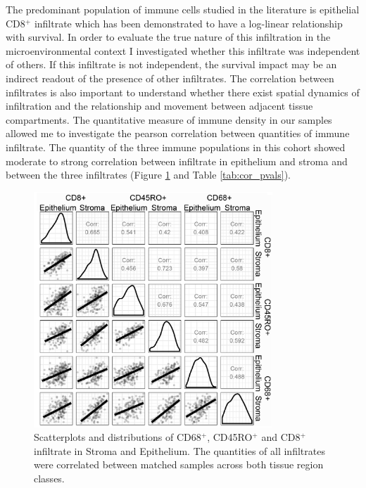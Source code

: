The predominant population of immune cells studied in the literature is epithelial CD8$^+$ infiltrate which has been demonstrated to have a log-linear relationship with survival. In order to evaluate the true nature of this infiltration in the microenvironmental context I investigated whether this infiltrate was independent of others. If this infiltrate is not independent, the survival impact may be an indirect readout of the presence of other infiltrates. The correlation between infiltrates is also important to understand whether there exist spatial dynamics of infiltration and the relationship and movement between adjacent tissue compartments. The quantitative measure of immune density in our samples allowed me to investigate the pearson correlation between quantities of immune infiltrate. The quantity of the three immune populations in this cohort showed moderate to strong correlation between infiltrate in epithelium and stroma and between the three infiltrates (Figure \ref{fig:ch2_correlation} and Table \ref{tab:cor_pvals}). 

\begin{figure}
    \centering
    \includegraphics[width=0.8\textwidth]{Chapter2/Figs/Raster/correlation_inf.png}
    \caption[Correlation between infiltrates]{Scatterplots and distributions of CD68$^+$, CD45RO$^+$ and CD8$^+$ infiltrate in Stroma and Epithelium. The quantities of all infiltrates were correlated between matched samples across both tissue region classes.}
    \label{fig:ch2_correlation}
\end{figure}

